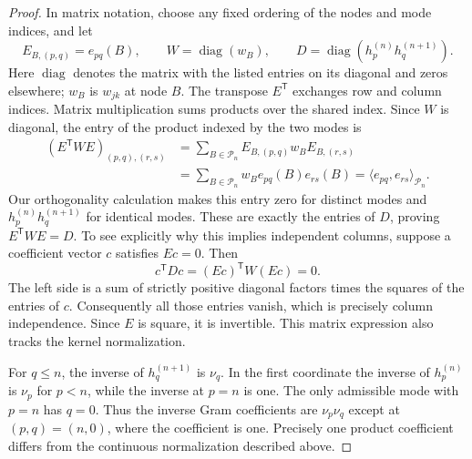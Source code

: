 \begin{proof}
In matrix notation, choose any fixed ordering of the nodes and mode
indices, and let
\[
 E_{B,(p,q)}=e_{pq}(B),\qquad
 W=\operatorname{diag}(w_B),\qquad
 D=\operatorname{diag}(h_p^{(n)}h_q^{(n+1)}).
\]
Here $\operatorname{diag}$ denotes the matrix with the listed entries
on its diagonal and zeros elsewhere; $w_B$ is $w_{jk}$ at node $B$.
The transpose $E^{\mathsf T}$ exchanges row and column indices.
Matrix multiplication sums products over the shared index. Since $W$
is diagonal, the entry of the product indexed by the two modes is
\begin{align*}
 (E^{\mathsf T}WE)_{(p,q),(r,s)}
 &=\sum_{B\in\mathcal P_n}
       E_{B,(p,q)}w_BE_{B,(r,s)}\\
 &=\sum_{B\in\mathcal P_n}w_B e_{pq}(B)e_{rs}(B)
   =\langle e_{pq},e_{rs}\rangle_{\mathcal P_n}.
\end{align*}
Our orthogonality calculation makes this entry zero for distinct modes
and $h_p^{(n)}h_q^{(n+1)}$ for identical modes. These are exactly the
entries of $D$, proving $E^{\mathsf T}WE=D$. To see explicitly why
this implies independent columns, suppose a coefficient vector $c$
satisfies $Ec=0$. Then
\[
 c^{\mathsf T}Dc=(Ec)^{\mathsf T}W(Ec)=0.
\]
The left side is a sum of strictly positive diagonal factors times the
squares of the entries of $c$. Consequently all those entries vanish,
which is precisely column independence. Since $E$ is square, it is invertible. This matrix
expression also tracks the kernel normalization.

For $q\leq n$, the inverse of $h_q^{(n+1)}$ is $\nu_q$. In the
first coordinate the inverse of $h_p^{(n)}$ is $\nu_p$ for $p<n$,
while the inverse at $p=n$ is one. The only admissible mode with $p=n$
has $q=0$. Thus the inverse Gram coefficients are $\nu_p\nu_q$ except
at $(p,q)=(n,0)$, where the coefficient is one. Precisely one product
coefficient differs from the continuous normalization described above.


\end{proof}
